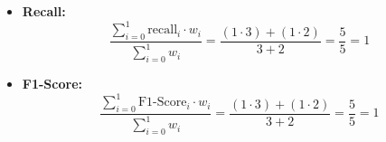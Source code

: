 \begin{itemize}
\begin{itemize}
            \item \textbf{Recall:} \[\frac{\sum_{i=0}^{1} \text{recall}_i \cdot w_i }{\sum_{i=0}^{1} w_i} = \frac{(1 \cdot 3) + (1 \cdot 2)}{3 + 2} = \frac{5}{5} = 1\]
            
            \item \textbf{F1-Score:} \[\frac{\sum_{i=0}^{1} \text{F1-Score}_i \cdot w_i }{\sum_{i=0}^{1} w_i} = \frac{(1 \cdot 3) + (1 \cdot 2)}{3 + 2} = \frac{5}{5} = 1\]
        \end{itemize}
\end{itemize}